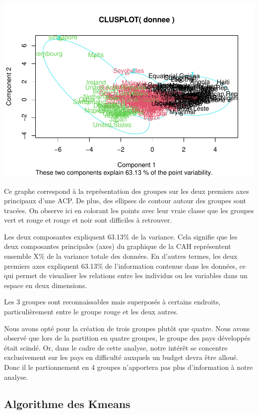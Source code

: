 \documentclass[
]{article}
\begin{document}
\includegraphics{Projet_files/figure-latex/unnamed-chunk-19-1.pdf}

Ce graphe correspond à la représentation des groupes sur les deux
premiers axes principaux d'une ACP. De plus, des ellipses de contour
autour des groupes sont tracées. On observe ici en colorant les points
avec leur vraie classe que les groupes vert et rouge et rouge et noir
sont difficiles à retrouver.

Les deux composantes expliquent 63.13\% de la variance. Cela signifie
que les deux composantes principales (axes) du graphique de la CAH
représentent ensemble X\% de la variance totale des données. En d'autres
termes, les deux premiers axes expliquent 63.13\% de l'information
contenue dans les données, ce qui permet de visualiser les relations
entre les individus ou les variables dans un espace en deux dimensions.

Les 3 groupes sont reconnaissables mais superposés à certains endroits,
particulièrement entre le groupe rouge et les deux autres.

Nous avons opté pour la création de trois groupes plutôt que quatre.
Nous avons observé que lors de la partition en quatre groupes, le groupe
des pays développés était scindé. Or, dans le cadre de cette analyse,
notre intérêt se concentre exclusivement sur les pays en difficulté
auxquels un budget devra être alloué. Donc il le partionnement en 4
groupes n'apportera pas plus d'information à notre analyse.

\hypertarget{algorithme-des-kmeans}{%
\subsection{Algorithme des Kmeans}\label{algorithme-des-kmeans}}
\end{document}
